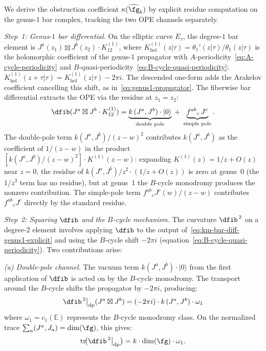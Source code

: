 \begin{computation}[First-principles derivation of
$\kappa(\widehat{\fg}_k) = \dim(\fg)(k+h^\vee)/(2h^\vee)$]
\label{comp:km-kappa-first-principles}

We derive the obstruction coefficient
$\kappa(\widehat{\fg}_k)$ by explicit residue computation
on the genus-$1$ bar complex, tracking the two OPE channels
separately.

\emph{Step~1: Genus-$1$ bar differential.}
On the elliptic curve $E_\tau$, the degree-$1$ bar element
is $J^a(z_1) \boxtimes J^b(z_2) \cdot K^{(1)}_{12}$,
where $K^{(1)}_{\mathrm{hol}}(z|\tau) = \theta_1'(z|\tau)/\theta_1(z|\tau)$
is the holomorphic coefficient of the genus-$1$ propagator with
$A$-periodicity~\eqref{eq:A-cycle-periodicity} and
$B$-quasi-periodicity~\eqref{eq:B-cycle-quasi-periodicity}:
$K^{(1)}_{\mathrm{hol}}(z+\tau|\tau) = K^{(1)}_{\mathrm{hol}}(z|\tau) - 2\pi i$.
The descended one-form adds the Arakelov coefficient cancelling this
shift, as in~\eqref{eq:genus1-propagator}.
The fiberwise bar differential extracts the OPE via
the residue at $z_1 = z_2$:
\begin{equation}\label{eq:km-bar-diff-genus1-explicit}
\dfib(J^a \boxtimes J^b \cdot K^{(1)}_{12})
= \underbrace{k\,(J^a, J^b) \cdot |0\rangle}_{%
 \text{double pole}}
\;+\;
\underbrace{f^{ab}{}_{c}\, J^c}_{%
 \text{simple pole}}.
\end{equation}
The double-pole term $k(J^a,J^b)/(z-w)^2$ contributes
$k(J^a,J^b)$ as the coefficient of $1/(z-w)$ in the
product $[k(J^a,J^b)/(z-w)^2]\cdot K^{(1)}(z-w)$:
expanding $K^{(1)}(z) = 1/z + O(z)$ near $z=0$, the
residue of $k(J^a,J^b)/z^2 \cdot (1/z + O(z))$ is zero
at genus~$0$ (the $1/z^3$ term has no residue), but at
genus~$1$ the $B$-cycle monodromy produces the nonzero
contribution. The simple-pole term
$f^{ab}{}_c J^c(w)/(z-w)$ contributes $f^{ab}{}_c J^c$
directly by the standard residue.

\emph{Step~2: Squaring $\dfib$ and the $B$-cycle mechanism.}
The curvature $\dfib^{\,2}$ on a degree-$2$ element
involves applying $\dfib$ to the output
of~\eqref{eq:km-bar-diff-genus1-explicit} and using the
$B$-cycle shift $-2\pi i$
(equation~\eqref{eq:B-cycle-quasi-periodicity}).
Two contributions arise:

\emph{(a) Double-pole channel.}
The vacuum term $k(J^a, J^b)\cdot|0\rangle$ from the first
application of $\dfib$ is acted on by the $B$-cycle
monodromy. The transport around the $B$-cycle shifts the
propagator by $-2\pi i$, producing:
\begin{equation}\label{eq:km-dp-channel}
\dfib^{\,2}\big|_{\mathrm{dp}}(J^a \boxtimes J^b)
= (-2\pi i)\cdot k\,(J^a, J^b) \cdot \omega_1
\end{equation}
where $\omega_1 = c_1(\mathbb{E})$ represents the
$B$-cycle monodromy class. On the normalized trace
$\sum_a (J^a, J_a) = \dim(\fg)$, this gives:
\[
\operatorname{tr}\!\bigl(\dfib^{\,2}\big|_{\mathrm{dp}}\bigr)
= k\cdot\dim(\fg)\cdot\omega_1.
\]


\end{computation}
